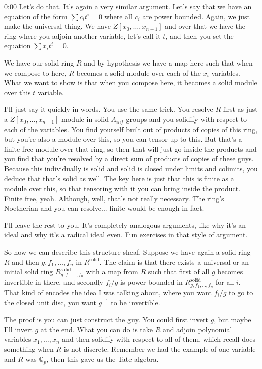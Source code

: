 \begin{unfinished}{0:00}
Let's do that. It's again a very similar argument. Let's say that we have an equation of the form $\sum c_i t^i = 0$ where all $c_i$ are power bounded. Again, we just make the universal thing. We have $Z[x_0, \dots, x_{n-1}]$ and over that we have the ring where you adjoin another variable, let's call it $t$, and then you set the equation $\sum x_i t^i = 0$.

We have our solid ring $R$ and by hypothesis we have a map here such that when we compose to here, $R$ becomes a solid module over each of the $x_i$ variables. What we want to show is that when you compose here, it becomes a solid module over this $t$ variable.

I'll just say it quickly in words. You use the same trick. You resolve $R$ first as just a $Z[x_0, \dots, x_{n-1}]$-module in solid $A_{inf}$ groups and you solidify with respect to each of the variables. You find yourself built out of products of copies of this ring, but you're also a module over this, so you can tensor up to this. But that's a finite free module over that ring, so then that will just go inside the products and you find that you're resolved by a direct sum of products of copies of these guys. Because this individually is solid and solid is closed under limits and colimits, you deduce that that's solid as well. The key here is just that this is finite as a module over this, so that tensoring with it you can bring inside the product. Finite free, yeah. Although, well, that's not really necessary. The ring's Noetherian and you can resolve... finite would be enough in fact.

I'll leave the rest to you. It's completely analogous arguments, like why it's an ideal and why it's a radical ideal even. Fun exercises in that style of argument.

So now we can describe this structure sheaf. Suppose we have again a solid ring $R$ and then $g, f_1, \dots, f_n$ in $R^\mathrm{solid}$. The claim is that there exists a universal or an initial solid ring $R^\mathrm{solid}_{g,f_1,\dots,f_n}$ with a map from $R$ such that first of all $g$ becomes invertible in there, and secondly $f_i/g$ is power bounded in $R^\mathrm{solid}_{g,f_1,\dots,f_n}$ for all $i$. That kind of encodes the idea I was talking about, where you want $f_i/g$ to go to the closed unit disc, you want $g^{-1}$ to be invertible.

The proof is you can just construct the guy. You could first invert $g$, but maybe I'll invert $g$ at the end. What you can do is take $R$ and adjoin polynomial variables $x_1, \dots, x_n$ and then solidify with respect to all of them, which recall does something when $R$ is not discrete. Remember we had the example of one variable and $R$ was $\mathbb{Q}_p$, then this gave us the Tate algebra.


\end{unfinished}
